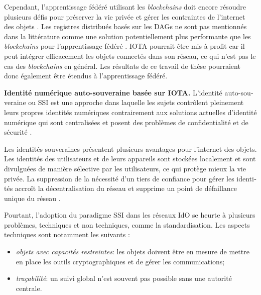 \begin{otherlanguage}{french}
 Cependant, l'apprentissage fédéré utilisant les \emph{blockchains} doit encore résoudre plusieurs défis pour préserver la vie privée et gérer les contraintes de l'internet des objets \cite{Issa2023}.
 Les registres distribués basés sur les DAGs ne sont pas mentionnés dans la littérature comme une solution potentiellement plus performante que les \emph{blockchains} pour l'apprentissage fédéré \cite{Issa2023, Qu2023}. IOTA pourrait être mis à profit car il peut intégrer efficacement les objets connectés dans son réseau, ce qui n'est pas le cas des \emph{blockchains} en général. Les résultats de ce travail de thèse pourraient donc également être étendus à l'apprentissage fédéré.

\textbf{Identité numérique auto-souveraine basée sur IOTA.} L'identité auto-souveraine ou SSI est une approche dans laquelle les sujets contrôlent pleinement leurs propres identités numériques \cite{Fedrecheski2020} contrairement aux solutions actuelles d'identité
numérique qui sont centralisées et posent des problèmes de confidentialité et de sécurité \cite{Fedrecheski2020}.

Les identités souveraines présentent plusieurs avantages pour l'internet des objets. Les identités des utilisateurs et de leurs appareils sont stockées localement et sont divulguées de manière sélective par les utilisateurs, ce qui protège mieux la vie privée. La suppression de la nécessité d'un tiers de confiance pour gérer les identités accroît la décentralisation du réseau et supprime un point de défaillance unique du réseau \cite{Fedrecheski2020}. 

Pourtant, l'adoption du paradigme SSI dans les réseaux IdO se heurte à plusieurs problèmes, techniques et non techniques, comme la standardisation. 
Les aspects techniques sont notamment les suivants :
\begin{itemize}
    \item \emph{objets avec capacités restreintes}: les objets doivent être en mesure de mettre en place les outils cryptographiques et de gérer les communications;
    \item \emph{traçabilité}: un suivi global n'est souvent pas possible sans une autorité centrale.
\end{itemize}


\end{otherlanguage}
